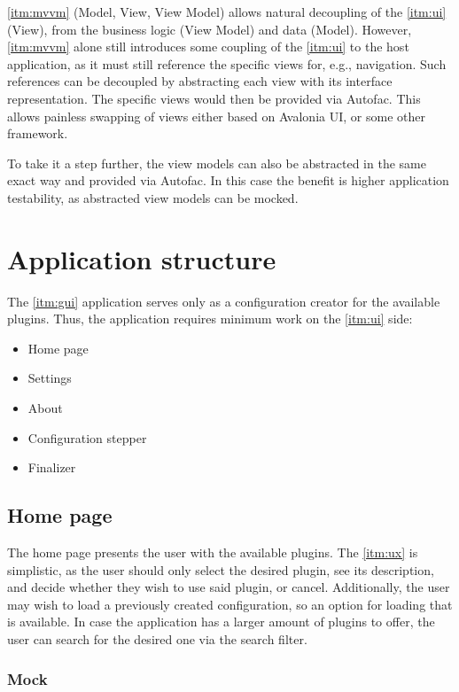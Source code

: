 \ref{itm:mvvm} (Model, View, View Model) allows natural decoupling of the \ref{itm:ui} (View), from the business logic (View Model) and data (Model). However, \ref{itm:mvvm} alone still introduces some coupling of the \ref{itm:ui} to the host application, as it must still reference the specific views for, e.g., navigation. Such references can be decoupled by abstracting each view with its interface representation. The specific views would then be provided via Autofac. This allows painless swapping of views either based on Avalonia UI, or some other framework.

To take it a step further, the view models can also be abstracted in the same exact way and provided via Autofac. In this case the benefit is higher application testability, as abstracted view models can be mocked.

\section{Application structure}

The \ref{itm:gui} application serves only as a configuration creator for the available plugins. Thus, the application requires minimum work on the \ref{itm:ui} side:
\begin{itemize}
    \item Home page
    \item Settings
    \item About
    \item Configuration stepper
    \item Finalizer
\end{itemize}

\subsection{Home page}

The home page presents the user with the available plugins. The \ref{itm:ux} is simplistic, as the user should only select the desired plugin, see its description, and decide whether they wish to use said plugin, or cancel. Additionally, the user may wish to load a previously created configuration, so an option for loading that is available.
In case the application has a larger amount of plugins to offer, the user can search for the desired one via the search filter.

\subsubsection{Mock}

